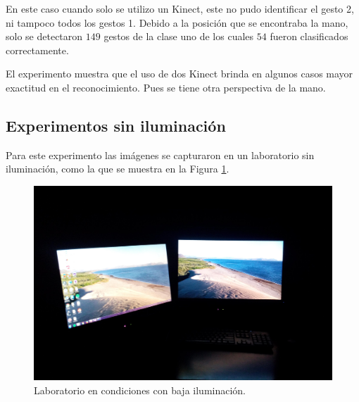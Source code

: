 \begin{itemize}
En este caso cuando solo se utilizo un Kinect, este no pudo identificar el gesto 2, ni tampoco todos los gestos 1. Debido a la posición que se encontraba la mano, solo se detectaron $149$ gestos de la clase uno de los cuales $54$ fueron clasificados correctamente.

El experimento muestra que el uso de dos Kinect brinda en algunos casos mayor exactitud en el reconocimiento. Pues se tiene otra perspectiva de la mano. 

\end{itemize}


\subsection{Experimentos sin iluminación}
Para este experimento las imágenes se capturaron en un laboratorio sin iluminación, como la que se muestra en la Figura \ref{fig:LabNoIluminado}.

\begin{figure}[h!]
\begin{center} 
\includegraphics[scale=0.09]{./Figures/noIluminacion.jpg}
\end{center}
\caption{Laboratorio en condiciones con baja iluminación.}
\label{fig:LabNoIluminado} 
\end{figure} 



